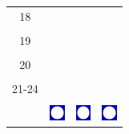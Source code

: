 \documentclass[a4paper,12pt, tikz]{scrartcl}
\begin{document}
\begin{tabularx}{\linewidth}{|c|X|X|X|}
      \hline
      18&   &       &    \\
        &   &       &    \\
      \hline
      19&   &       &    \\
        &   &       &    \\
      \hline
      20&   &       &    \\
        &   &       &    \\
      \hline
      21-24&   &       &    \\
        &   &       &    \\
      \hline  
      & \vspace{0.01cm} \centerline{\includegraphics[width=0.5cm]{moon_phases/Moon_phase_4.svg.png}} \vspace{0.1cm} & \vspace{0.01cm} \centerline{\includegraphics[width=0.5cm]{moon_phases/Moon_phase_4.svg.png}} \vspace{0.1cm} & \vspace{0.01cm} \centerline{\includegraphics[width=0.5cm]{moon_phases/Moon_phase_4.svg.png}} \vspace{0.1cm}\\
      \hline   
    \end{tabularx}




    \newpage

        \noindent
\end{document}
